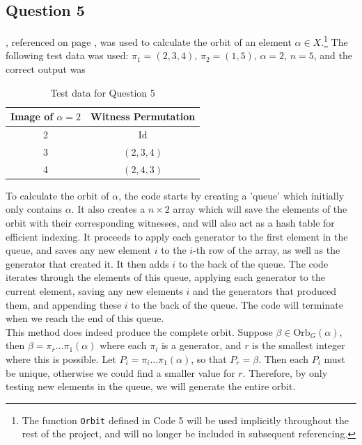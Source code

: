 \documentclass[10pt,a4paper,notitlepage]{article}
\newcommand{\Orb}{\text{Orb}}
\newcommand{\Id}{\text{Id}}
\begin{document}
\subsection*{\centering Question 5}
, referenced on page \pageref{cd:5}, was used to calculate the orbit of an element $\alpha\in X$.\footnote{The function \texttt{Orbit} defined in Code 5 will be used implicitly throughout the rest of the project, and will no longer be included in subsequent referencing.} The following test data was used: $\pi_{1}=(2,3,4)$, $\pi_{2}=(1,5)$, $\alpha=2$, $n=5$, and the correct output was
\begin{table}[H]
\centering
\begin{tabular}{|c|c|}
\hline Image of $\alpha=2$ & Witness Permutation \\
\hline 2 & $\Id$\\
3 & $(2,3,4)$\\
4 & $(2,4,3)$\\
\hline
\end{tabular}
\caption{Test data for Question 5}
\end{table}
To calculate the orbit of $\alpha$, the code starts by creating a 'queue' which initially only contains $\alpha$. It also creates a $n\times 2$ array which will save the elements of the orbit with their corresponding witnesses, and will also act as a hash table for efficient indexing. It proceeds to apply each generator to the first element in the queue, and saves any new element $i$ to the $i$-th row of the array, as well as the generator that created it. It then adds $i$ to the back of the queue. The code iterates through the elements of this queue, applying each generator to the current element,  saving any new elements $i$ and the generators that produced them, and appending these $i$ to the back of the queue. The code will terminate when we reach the end of this queue.\\

This method does indeed produce the complete orbit. Suppose $\beta \in \Orb_{G}(\alpha)$, then $\beta = \pi_{r}\hdots \pi_{1} (\alpha)$ where each $\pi_{i}$ is a generator, and $r$ is the smallest integer where this is possible. Let $P_{i}=\pi_{i}\hdots\pi_{1}(\alpha)$, so that $P_{r}=\beta$. Then each $P_{i}$ must be unique, otherwise we could find a smaller value for $r$. Therefore, by only testing new elements in the queue, we will generate the entire orbit. \\
\end{document}
